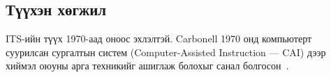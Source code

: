 \documentclass[12pt,A4]{report}
\newcommand{\eng}[1]{#1}
\begin{document}








\subsection{Түүхэн хөгжил}

ITS-ийн түүх 1970-аад оноос эхлэлтэй. \eng{Carbonell} 1970 онд компьютерт суурилсан сургалтын систем (\eng{Computer-Assisted Instruction} — \eng{CAI}) дээр хиймэл оюуны арга техникийг ашиглаж болохыг санал болгосон~\cite{carbonell1970}.
\end{document}
